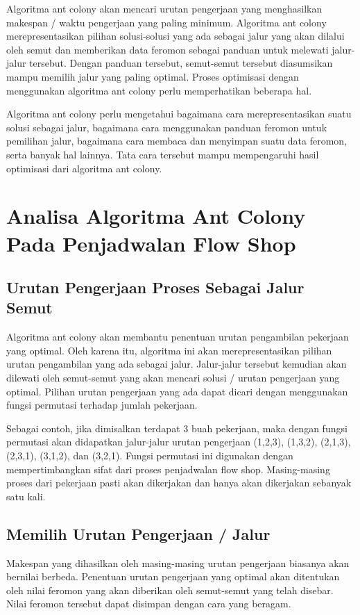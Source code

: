	Algoritma ant colony akan mencari urutan pengerjaan yang menghasilkan makespan / waktu
	pengerjaan yang paling minimum. Algoritma ant colony merepresentasikan pilihan solusi-solusi
	yang ada sebagai jalur yang akan dilalui oleh semut dan memberikan data feromon sebagai panduan
	untuk melewati jalur-jalur tersebut. Dengan panduan tersebut, semut-semut tersebut diasumsikan
	mampu memilih jalur yang paling optimal.
	Proses optimisasi dengan menggunakan algoritma ant colony perlu memperhatikan beberapa
	hal. 
	
	Algoritma ant colony perlu mengetahui bagaimana cara merepresentasikan suatu solusi sebagai
	jalur, bagaimana cara menggunakan panduan feromon untuk pemilihan jalur, bagaimana cara
	membaca dan menyimpan suatu data feromon, serta banyak hal lainnya. Tata cara tersebut mampu
	mempengaruhi hasil optimisasi dari algoritma ant colony.
\section{Analisa Algoritma Ant Colony Pada Penjadwalan Flow Shop}

\subsection{Urutan Pengerjaan Proses Sebagai Jalur Semut}
	Algoritma ant colony akan membantu penentuan urutan pengambilan pekerjaan yang optimal. Oleh
	karena itu, algoritma ini akan merepresentasikan pilihan urutan pengambilan yang ada sebagai jalur. Jalur-jalur tersebut kemudian akan dilewati oleh semut-semut yang akan mencari solusi / urutan pengerjaan yang optimal. Pilihan urutan pengerjaan yang ada dapat dicari dengan menggunakan fungsi permutasi terhadap jumlah pekerjaan.

	Sebagai contoh, jika dimisalkan terdapat 3 buah pekerjaan, maka dengan fungsi permutasi akan
	didapatkan jalur-jalur urutan pengerjaan (1,2,3), (1,3,2), (2,1,3), (2,3,1), (3,1,2), dan (3,2,1). Fungsi
	permutasi ini digunakan dengan mempertimbangkan sifat dari proses penjadwalan flow shop.
	Masing-masing proses dari pekerjaan pasti akan dikerjakan dan hanya akan dikerjakan sebanyak
	satu kali.

\subsection{Memilih Urutan Pengerjaan / Jalur}
	Makespan yang dihasilkan oleh masing-masing urutan pengerjaan biasanya akan bernilai berbeda.
	Penentuan urutan pengerjaan yang optimal akan ditentukan oleh nilai feromon yang akan diberikan
	oleh semut-semut yang telah disebar. Nilai feromon tersebut dapat disimpan dengan cara yang
	beragam.

